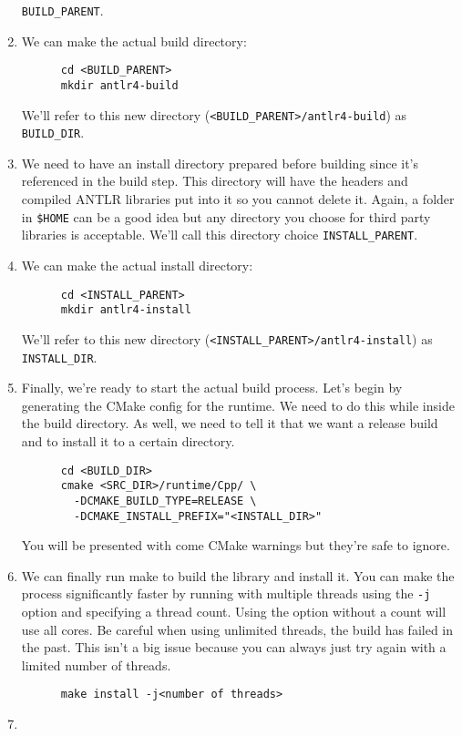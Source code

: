 \documentclass[../setup.tex]{subfiles}
\begin{document}
\begin{enumerate}
    \lstinline{BUILD_PARENT}.
  \item
    We can make the actual build directory:
    \begin{lstlisting}
      cd <BUILD_PARENT>
      mkdir antlr4-build
    \end{lstlisting}
    We'll refer to this new directory (\lstinline{<BUILD_PARENT>/antlr4-build}) as
    \lstinline{BUILD_DIR}.
  \item
    We need to have an install directory prepared before building since it's referenced in the
    build step. This directory will have the headers and compiled ANTLR libraries put into it so
    you cannot delete it. Again, a folder in \lstinline{$HOME} can be a good idea but any
    directory you choose for third party libraries is acceptable. We'll call this directory choice
    \lstinline{INSTALL_PARENT}.
  \item
    We can make the actual install directory:
    \begin{lstlisting}
      cd <INSTALL_PARENT>
      mkdir antlr4-install
    \end{lstlisting}
    We'll refer to this new directory (\lstinline{<INSTALL_PARENT>/antlr4-install}) as
    \lstinline{INSTALL_DIR}.
  \item
    Finally, we're ready to start the actual build process. Let's begin by generating the CMake
    config for the runtime. We need to do this while inside the build directory. As well, we need
    to tell it that we want a release build and to install it to a certain directory.
    \begin{lstlisting}
      cd <BUILD_DIR>
      cmake <SRC_DIR>/runtime/Cpp/ \
        -DCMAKE_BUILD_TYPE=RELEASE \
        -DCMAKE_INSTALL_PREFIX="<INSTALL_DIR>"
    \end{lstlisting}
    You will be presented with come CMake warnings but they're safe to ignore.
  \item
    We can finally run make to build the library and install it. You can make the process
    significantly faster by running with multiple threads using the \lstinline{-j} option and
    specifying a thread count. Using the option without a count will use all cores. Be careful when
    using unlimited threads, the build has failed in the past. This isn't a big issue because you
    can always just try again with a limited number of threads.
    \begin{lstlisting}
      make install -j<number of threads>
    \end{lstlisting}
  \item

\end{enumerate}
\end{document}
